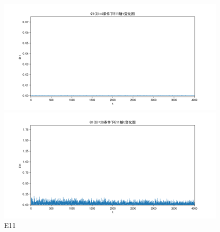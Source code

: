 \documentclass[10pt, a4paper]{article}
\begin{document}
    \begin{figure}[H]
        \begin{minipage}[t]{0.49\textwidth}
            \centering
            \includegraphics[width=\textwidth]{./q5_pics/cmp/E11.png}
        \end{minipage}
        \begin{minipage}[t]{0.49\textwidth}
            \centering
            \includegraphics[width=\textwidth]{./q5_pics/exp/E11.png}
        \end{minipage}
        \caption{E11}\label{fig:E11 in q5}
    \end{figure}
\end{document}
